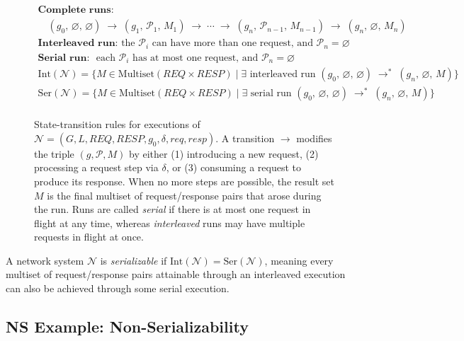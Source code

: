 \begin{figure}[t]
    \[
    \begin{array}{c}
    \textbf{Complete runs:}
    \\
    \quad (g_0,\,\varnothing,\,\varnothing) \;\longrightarrow\; (g_1,\,\mathcal{P}_1,\,M_1) \;\longrightarrow\; \cdots \;\longrightarrow\; (g_n,\,\mathcal{P}_{n-1},\,M_{n-1}) \;\longrightarrow\; (g_n,\,\varnothing,\,M_n)
    \\[1em]
    \textbf{Interleaved run: } \text{the } \mathcal{P}_i \text{ can have more than one request, and } \mathcal{P}_n = \varnothing \\
    \textbf{Serial run: } \text{ each } \mathcal{P}_i \text{ has at most one request, and } \mathcal{P}_n = \varnothing\\
    \text{Int}(\mathcal{N}) = \{ M \in \text{Multiset}(\mathit{REQ} \times \mathit{RESP}) \mid \exists \text{ interleaved run } (g_0,\,\varnothing,\,\varnothing) \;\longrightarrow^*\; (g_n,\,\varnothing,\,M) \}\\
    \text{Ser}(\mathcal{N}) = \{ M \in \text{Multiset}(\mathit{REQ} \times \mathit{RESP}) \mid \exists \text{ serial run } (g_0,\,\varnothing,\,\varnothing) \;\longrightarrow^*\; (g_n,\,\varnothing,\,M) \}\\
    \end{array}
    \]

    \caption{State-transition rules for executions of
    \(\mathcal{N} = (G, L, \mathit{REQ}, \mathit{RESP}, g_0, \delta, \mathit{req}, \mathit{resp})\).
    A transition \(\longrightarrow\) modifies the triple \((g,\mathcal{P}, M)\) by either (1) introducing a new request, (2) processing a request step via \(\delta\), or (3) consuming a request to produce its response.  When no more steps are possible, the result set \(M\) is the final multiset of request/response pairs that arose during the run.
    Runs are called \emph{serial} if there is at most one request in flight at any time, whereas \emph{interleaved} runs may have multiple requests in flight at once.}
    \label{fig:network-transitions}
\end{figure}

\begin{definition}[Serializability]
A network system $\mathcal{N}$ is \emph{serializable} if $\text{Int}(\mathcal{N}) = \text{Ser}(\mathcal{N})$, meaning every multiset of request/response pairs attainable through an interleaved execution can also be achieved through some serial execution.
\end{definition}

\subsection{NS Example: Non-Serializability }
\label{sec:ns-non-serializable}

